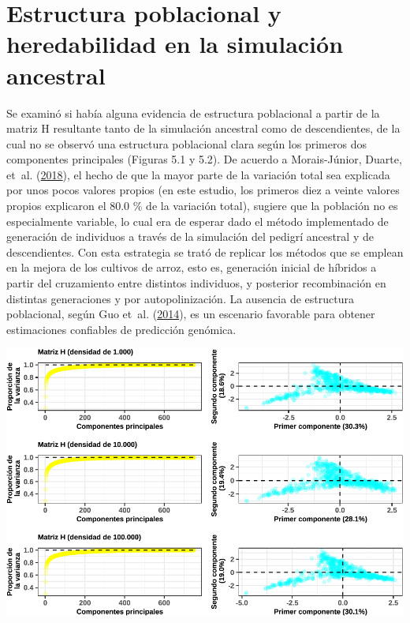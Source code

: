 \documentclass[11pt,spanish,a4paper,oneside,]{book} %
\begin{document}
\hypertarget{estructura-poblacional-y-heredabilidad-en-la-simulaciuxf3n-ancestral}{%
\section{Estructura poblacional y heredabilidad en la simulación ancestral}\label{estructura-poblacional-y-heredabilidad-en-la-simulaciuxf3n-ancestral}}

Se examinó si había alguna evidencia de estructura poblacional a partir de la matriz H resultante tanto de la simulación ancestral como de descendientes, de la cual no se observó una estructura poblacional clara según los primeros dos componentes principales (Figuras 5.1 y 5.2). De acuerdo a Morais-Júnior, Duarte, et~al. (\protect\hyperlink{ref-cite:69}{2018}), el hecho de que la mayor parte de la variación total sea explicada por unos pocos valores propios (en este estudio, los primeros diez a veinte valores propios explicaron el 80.0 \% de la variación total), sugiere que la población no es especialmente variable, lo cual era de esperar dado el método implementado de generación de individuos a través de la simulación del pedigrí ancestral y de descendientes. Con esta estrategia se trató de replicar los métodos que se emplean en la mejora de los cultivos de arroz, esto es, generación inicial de híbridos a partir del cruzamiento entre distintos individuos, y posterior recombinación en distintas generaciones y por autopolinización. La ausencia de estructura poblacional, según Guo et~al. (\protect\hyperlink{ref-cite:70}{2014}), es un escenario favorable para obtener estimaciones confiables de predicción genómica.

\begin{center}\includegraphics[width=1\linewidth]{figures/Graf_PCA_mH_Molcoanc} \end{center}
\end{document}
